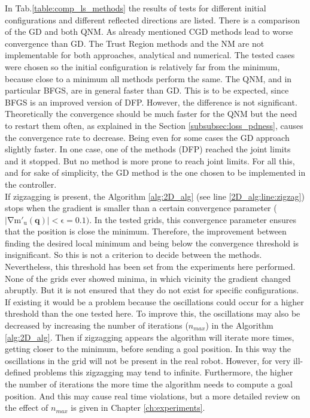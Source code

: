 In Tab.\ref{table:comp_ls_methods} the results of tests for different initial configurations and different reflected directions are listed. There is a comparison of the GD and both QNM. As already mentioned CGD methods lead to worse convergence than GD. The Trust Region methods and the NM are not implementable for both approaches, analytical and numerical.
The tested cases were chosen so the initial configuration is relatively far from the minimum, because close to a minimum all methods perform the same.
The QNM, and in particular BFGS, are in general faster than GD. This is to be expected, since BFGS is an improved version of DFP. However, the difference is not significant. Theoretically the convergence should be much faster for the QNM but the need to restart them often, as explained in the Section \ref{subsubsec:loss_pdness}, causes the convergence rate to decrease. Being even for some cases the GD approach slightly faster.
In one case, one of the methods (DFP) reached the joint limits and it stopped. But no method is more prone to reach joint limits. For all this, and for sake of simplicity, the GD method is the one chosen to be implemented in the controller.\\
If zigzagging is present, the Algorithm \ref{alg:2D_alg} (see line \ref{2D_alg:line:zigzag}) stops when the gradient is smaller than a certain convergence parameter ($\mathrm{|\nabla m'_u(\mathbf{q})| < \epsilon=0.1 )}$.
In the tested grids, this convergence parameter ensures that the position is close the minimum. Therefore, the improvement between finding the desired local minimum and being below the convergence threshold is insignificant. So this is not a criterion to decide between the methods.
Nevertheless, this threshold has been set from the experiments here performed. None of the grids ever showed minima, in which vicinity the gradient changed abruptly. But it is not ensured that they do not exist for specific configurations. If existing it would be a problem because the oscillations could occur for a higher threshold than the one tested here. To improve this, the oscillations may also be decreased by increasing the number of iterations ($n_{max}$) in the Algorithm \ref{alg:2D_alg}. Then if zigzagging appears the algorithm will iterate more times, getting closer to the minimum, before sending a goal position. In this way the oscillations in the grid will not be present in the real robot. However, for very ill-defined problems this zigzagging may tend to infinite. Furthermore, the higher the number of iterations the more time the algorithm needs to compute a goal position. And this may cause real time violations, but a more detailed review on the effect of $n_{max}$ is given in Chapter \ref{ch:experiments}. 

